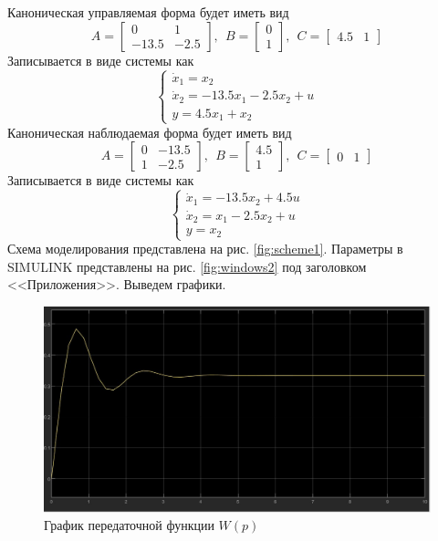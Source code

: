 \documentclass[a4paper, 12pt]{article}
\begin{document}
    Каноническая управляемая форма будет иметь вид
    $$
    A=
    \begin{bmatrix}
        0 & 1\\
        -13.5 & -2.5
    \end{bmatrix},\ \
    B=
    \begin{bmatrix}
        0\\
        1
    \end{bmatrix},\ \
    C=
    \begin{bmatrix}
        4.5 & 1
    \end{bmatrix}
    $$
    Записывается в виде системы как
    $$
    \begin{cases}
        \dot{x}_1=x_2\\
        \dot{x}_2=-13.5x_1-2.5x_2+u\\
        y=4.5x_1+x_2
    \end{cases}
    $$
    Каноническая наблюдаемая форма будет иметь вид
    $$
    A=
    \begin{bmatrix}
        0 & -13.5\\
        1 & -2.5
    \end{bmatrix},\ \
    B=
    \begin{bmatrix}
        4.5\\
        1
    \end{bmatrix},\ \
    C=
    \begin{bmatrix}
        0 & 1
    \end{bmatrix}
    $$
    Записывается в виде системы как
    $$
    \begin{cases}
        \dot{x}_1=-13.5x_2+4.5u\\
        \dot{x}_2=x_1-2.5x_2+u\\
        y=x_2
    \end{cases}
    $$
    Схема моделирования представлена на рис. \ref{fig:scheme1}.
    Параметры в SIMULINK представлены на рис. \ref{fig:windows2} под заголовком <<Приложения>>. Выведем графики.
    \begin{figure}[H]
        \centering
        \includegraphics[scale=0.3]{W_p_2.jpg}
        \captionsetup{skip=0pt}
        \caption{График передаточной функции $W(p)$}
        \label{fig:wp2}
    \end{figure}
\end{document}
